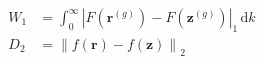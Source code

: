 \documentclass[12pt]{article}
\begin{document}
\begin{align*}
	W_1 &= \int_{0}^{\infty} \left| F\left(\mathbf{r}^{(g)}\right) - F\left(\mathbf{z}^{(g)}\right) \right|_1 \, \mathrm{d}k \\[8pt]
	D_2 &= \left\| f(\mathbf{r}) - f(\mathbf{z}) \right\|_2
\end{align*}
\end{document}
